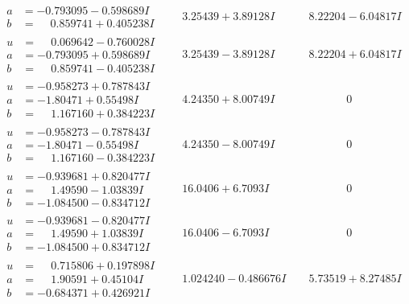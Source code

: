 \documentclass[1p]{elsarticle_modified}
\theoremstyle{definition}
\begin{document}
$$\begin{array}{c|c|c}
\begin{aligned}
a &= -0.793095 - 0.598689 I \\
b &= \phantom{-}0.859741 + 0.405238 I\end{aligned}
 & \phantom{-}3.25439 + 3.89128 I & \phantom{-}8.22204 - 6.04817 I \\ \hline\begin{aligned}
u &= \phantom{-}0.069642 - 0.760028 I \\
a &= -0.793095 + 0.598689 I \\
b &= \phantom{-}0.859741 - 0.405238 I\end{aligned}
 & \phantom{-}3.25439 - 3.89128 I & \phantom{-}8.22204 + 6.04817 I \\ \hline\begin{aligned}
u &= -0.958273 + 0.787843 I \\
a &= -1.80471 + 0.55498 I \\
b &= \phantom{-}1.167160 + 0.384223 I\end{aligned}
 & \phantom{-}4.24350 + 8.00749 I & \phantom{-0.000000 } 0 \\ \hline\begin{aligned}
u &= -0.958273 - 0.787843 I \\
a &= -1.80471 - 0.55498 I \\
b &= \phantom{-}1.167160 - 0.384223 I\end{aligned}
 & \phantom{-}4.24350 - 8.00749 I & \phantom{-0.000000 } 0 \\ \hline\begin{aligned}
u &= -0.939681 + 0.820477 I \\
a &= \phantom{-}1.49590 - 1.03839 I \\
b &= -1.084500 - 0.834712 I\end{aligned}
 & \phantom{-}16.0406 + 6.7093 I & \phantom{-0.000000 } 0 \\ \hline\begin{aligned}
u &= -0.939681 - 0.820477 I \\
a &= \phantom{-}1.49590 + 1.03839 I \\
b &= -1.084500 + 0.834712 I\end{aligned}
 & \phantom{-}16.0406 - 6.7093 I & \phantom{-0.000000 } 0 \\ \hline\begin{aligned}
u &= \phantom{-}0.715806 + 0.197898 I \\
a &= \phantom{-}1.90591 + 0.45104 I \\
b &= -0.684371 + 0.426921 I\end{aligned}
 & \phantom{-}1.024240 - 0.486676 I & \phantom{-}5.73519 + 8.27485 I\\

\end{array}$$
\end{document}
